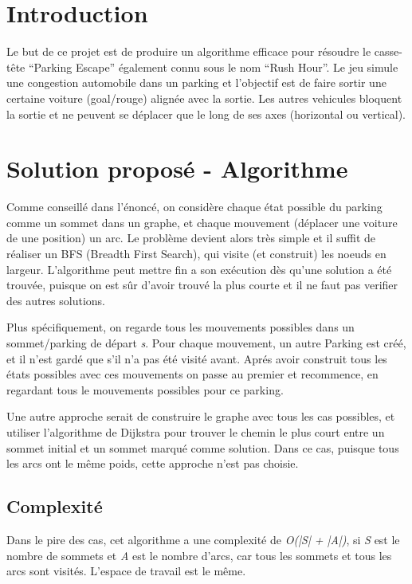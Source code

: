 \documentclass[11pt,a4paper]{article}
\begin{document}
\pagestyle{fancy}


\section{Introduction}

Le but de ce projet est de produire un algorithme efficace pour
résoudre le casse-tête ``Parking Escape'' également connu sous le nom
``Rush Hour''. Le jeu simule une congestion automobile dans un parking
et l'objectif est de faire sortir une certaine voiture (goal/rouge)
alignée avec la sortie. Les autres vehicules bloquent la sortie et ne
peuvent se déplacer que le long de ses axes (horizontal ou vertical).

\section{Solution proposé - Algorithme}

Comme conseillé dans l'énoncé, on considère chaque état possible du
parking comme un sommet dans un graphe, et chaque mouvement (déplacer
une voiture de une position) un arc. Le problème devient alors très
simple et il suffit de réaliser un BFS (Breadth First Search), qui
visite (et construit) les noeuds en largeur. L'algorithme peut mettre
fin a son exécution dès qu'une solution a été trouvée, puisque on est
sûr d'avoir trouvé la plus courte et il ne faut pas verifier des
autres solutions.

Plus spécifiquement, on regarde tous les mouvements possibles dans un
sommet/parking de départ \emph{s}. Pour chaque mouvement, un autre
Parking est créé, et il n'est gardé que s'il n'a pas été visité
avant. Aprés avoir construit tous les états possibles avec ces
mouvements on passe au premier et recommence, en regardant tous le
mouvements possibles pour ce parking.

Une autre approche serait de construire le graphe avec tous les cas
possibles, et utiliser l'algorithme de Dijkstra pour trouver le chemin
le plus court entre un sommet initial et un sommet marqué comme
solution. Dans ce cas, puisque tous les arcs ont le même poids, cette
approche n'est pas choisie.

\subsection{Complexité}

Dans le pire des cas, cet algorithme a une complexité de \emph{O(|S| +
  |A|)}, si \emph{S} est le nombre de sommets et \emph{A} est le
nombre d'arcs, car tous les sommets et tous les arcs sont
visités. L'espace de travail est le même.
\end{document}
